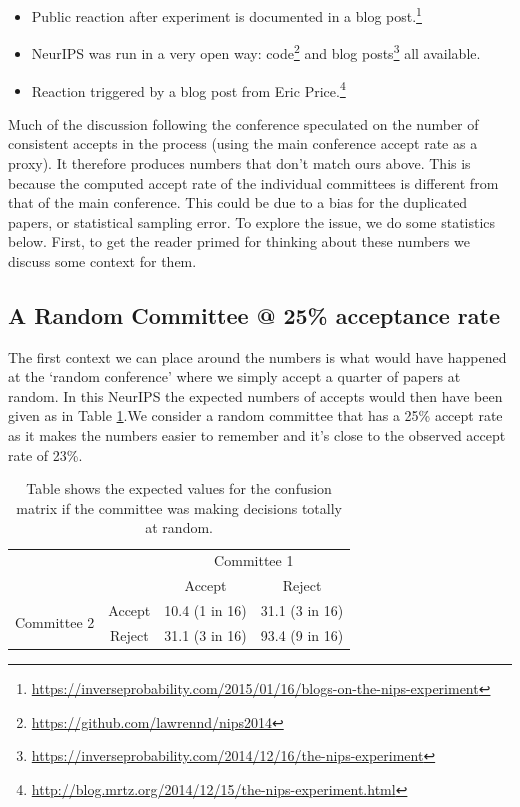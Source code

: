 \begin{itemize}
\item
  Public reaction after experiment is documented in a blog post.\footnote{\url{https://inverseprobability.com/2015/01/16/blogs-on-the-nips-experiment}}

\item
  NeurIPS was run in a very open way:
  code\footnote{\url{https://github.com/lawrennd/nips2014}} and
  blog
  posts\footnote{\url{https://inverseprobability.com/2014/12/16/the-nips-experiment}} all available.
\item
  Reaction triggered by a blog post from Eric Price.\footnote{\url{http://blog.mrtz.org/2014/12/15/the-nips-experiment.html}}
\end{itemize}

Much of the discussion following the conference speculated on the number of consistent accepts in
the process (using the main conference accept rate as a proxy). It
therefore produces numbers that don't match ours above. This is because
the computed accept rate of the individual committees is different from
that of the main conference. This could be due to a bias for the
duplicated papers, or statistical sampling error. To explore the issue, we do some statistics below. First, to get the reader primed for thinking about
these numbers we discuss some context for them.


\subsection{A Random Committee @ 25\% acceptance rate}\label{a-random-committee-25}
The first context we can place around the numbers is what would have
happened at the `random conference' where we simply accept a quarter of
papers at random. In this NeurIPS the expected numbers of accepts would
then have been given as in Table \ref{table-random-committee}.We consider a random committee that has a 25\% accept rate as it makes the numbers easier to remember and it's close to the observed accept rate of 23\%.

\begin{table}[htb]
\caption{Table shows the expected values for the confusion matrix if the committee was making decisions totally at random.}
\label{table-random-committee}
\centering


  \begin{tabular}{lc|c|c|}
  & & \multicolumn{2}{c}{Committee 1} \\
  & & Accept & Reject \\ \hline
  \multirow{2}{*}{Committee 2} & Accept & 10.4 (1 in 16) & 31.1 (3 in 16) \\ 
  & Reject & 31.1 (3 in 16) & 93.4 (9 in 16)
  \end{tabular}
\end{table}

